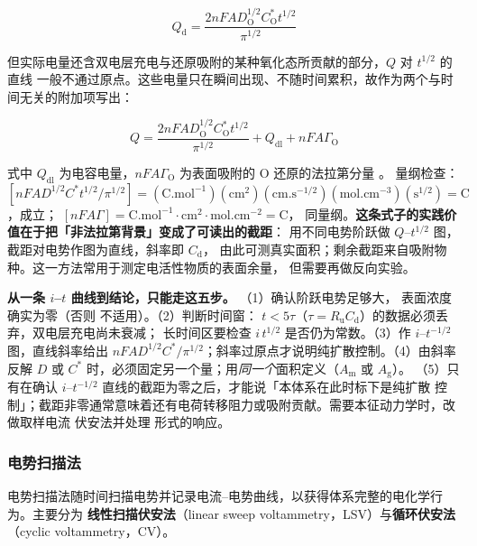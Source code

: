 \begin{equation}
Q_{\mathrm{d}}=\frac{2nFAD_{\mathrm{O}}^{1/2}C_{\mathrm{O}}^*t^{1/2}}{\pi^{1/2}}
\label{eq:chronocoul}
\end{equation}

但实际电量还含双电层充电与还原吸附的某种氧化态所贡献的部分，$Q$ 对 $t^{1/2}$ 的直线
一般不通过原点。这些电量只在瞬间出现、不随时间累积，故作为两个与时间无关的附加项写出：

\begin{equation}
Q=\frac{2nFAD_{\mathrm{O}}^{1/2}C_{\mathrm{O}}^*t^{1/2}}{\pi^{1/2}}
+Q_{\mathrm{dl}}+nFA\Gamma_{\mathrm{O}}
\label{eq:chronocoul-full}
\end{equation}

式中 $Q_{\mathrm{dl}}$ 为电容电量，$nFA\Gamma_{\mathrm{O}}$ 为表面吸附的
$\mathrm{O}$ 还原的法拉第分量 。
量纲检查：$[nFAD^{1/2}C^*t^{1/2}/\pi^{1/2}]=(\mathrm{C.mol^{-1}})(\mathrm{cm^2})
(\mathrm{cm.s^{-1/2}})(\mathrm{mol.cm^{-3}})(\mathrm{s^{1/2}})=\mathrm{C}$，成立；
$[nFA\Gamma]=\mathrm{C.mol^{-1}}\cdot\mathrm{cm^2}\cdot\mathrm{mol.cm^{-2}}=\mathrm{C}$，
同量纲。\textbf{这条式子的实践价值在于把「非法拉第背景」变成了可读出的截距}：
用不同电势阶跃做 $Q$--$t^{1/2}$ 图，截距对电势作图为直线，斜率即 $C_{\mathrm{d}}$，
由此可测真实面积；剩余截距来自吸附物种。这一方法常用于测定电活性物质的表面余量，
但需要再做反向实验。

\begin{dataflow}
\textbf{从一条 $i$--$t$ 曲线到结论，只能走这五步。} （1）确认阶跃电势足够大，
表面浓度确实为零（否则  不适用）。（2）判断时间窗：
$t<5\tau$（$\tau=R_{\mathrm{u}}C_{\mathrm{d}}$）的数据必须丢弃，双电层充电尚未衰减；
长时间区要检查 $i\,t^{1/2}$ 是否仍为常数。（3）作 $i$--$t^{-1/2}$ 图，直线斜率给出
$nFAD^{1/2}C^*/\pi^{1/2}$；斜率过原点才说明纯扩散控制。（4）由斜率反解 $D$ 或 $C^*$
时，必须固定另一个量；用\emph{同一个}面积定义（$A_{\mathrm{m}}$ 或 $A_{\mathrm{g}}$）。
（5）只有在确认 $i$--$t^{-1/2}$ 直线的截距为零之后，才能说「本体系在此时标下是纯扩散
控制」；截距非零通常意味着还有电荷转移阻力或吸附贡献。需要本征动力学时，改做取样电流
伏安法并处理  形式的响应。
\end{dataflow}

\subsubsection{电势扫描法}

电势扫描法随时间扫描电势并记录电流--电势曲线，以获得体系完整的电化学行为。主要分为
\textbf{线性扫描伏安法}（linear sweep voltammetry，LSV）与\textbf{循环伏安法}
（cyclic voltammetry，CV）。

